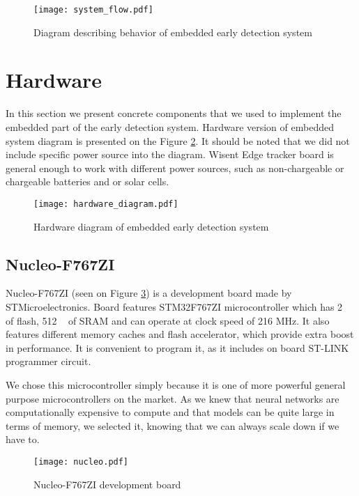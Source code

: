 \begin{figure}[ht]
        \centering
        \texttt{[image: system\_flow.pdf]} 
        \caption{ Diagram describing behavior of embedded early detection system} 
        \label{system_flow}
\end{figure}


\section{ Hardware}

In this section we present concrete components that we used to implement the embedded part of the early detection system.
Hardware version of embedded system diagram is presented on the Figure \ref{hardware_diagram}.
It should be noted that we did not include specific power source into the diagram.
Wisent Edge tracker board is general enough to work with different power sources, such as non-chargeable or chargeable batteries and or solar cells.

\begin{figure}[ht]
        \centering
        \texttt{[image: hardware\_diagram.pdf]} 
        \caption{ Hardware diagram of embedded early detection system} 
        \label{hardware_diagram}
\end{figure}

\subsection{ Nucleo-F767ZI}

Nucleo-F767ZI (seen on Figure \ref{nucleo}) is a development board made by STMicroelectronics.
Board features STM32F767ZI microcontroller which has 2 \si{\mega\byte} of flash, 512 \si{\kilo\byte} of SRAM and can operate at clock speed of 216 \si{\mega\hertz}.
It also features different memory caches and flash accelerator, which provide extra boost in performance.
It is convenient to program it, as it includes on board ST-LINK programmer circuit.

We chose this microcontroller simply because it is one of more powerful general purpose microcontrollers on the market.
As we knew that neural networks are computationally expensive to compute and that models can be quite large in terms of memory, we selected it, knowing that we can always scale down if we have to.

\begin{figure}[ht]
        \centering
        \texttt{[image: nucleo.pdf]} 
        \caption{ Nucleo-F767ZI development board} 
        \label{nucleo}
\end{figure}


